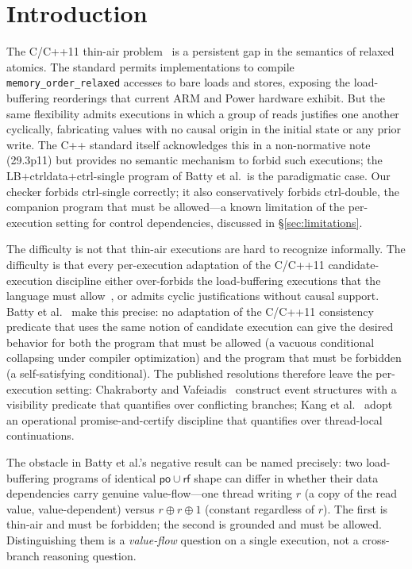 \documentclass{llncs}
\newcommand{\rf}{\mathsf{rf}}
\newcommand{\po}{\mathsf{po}}
\begin{document}
\section{Introduction}
\label{sec:intro}

The C/C++11 thin-air problem~\cite{boehmDemsky2014outlawing,batty2015problem}
is a persistent gap in the semantics of relaxed atomics. The standard permits
implementations to compile \texttt{memory\_order\_relaxed} accesses to bare
loads and stores, exposing the load-buffering reorderings that current ARM and
Power hardware exhibit. But the same flexibility admits executions in which a
group of reads justifies one another cyclically, fabricating values with no
causal origin in the initial state or any prior write. The C++ standard itself
acknowledges this in a non-normative note (29.3p11) but provides no semantic
mechanism to forbid such executions; the LB+ctrldata+ctrl-single program of
Batty et al.\ is the paradigmatic case. Our checker forbids ctrl-single
correctly; it also conservatively forbids ctrl-double, the companion program
that must be allowed---a known limitation of the per-execution setting for
control dependencies, discussed in \S\ref{sec:limitations}.

The difficulty is not that thin-air executions are hard to recognize
informally. The difficulty is that every per-execution adaptation of the
C/C++11 candidate-execution discipline either over-forbids the load-buffering
executions that the language must allow~\cite{lahav2017repairing}, or admits
cyclic justifications without causal support. Batty et
al.~\cite[Theorem~2]{batty2015problem} make this precise: no adaptation of
the C/C++11 consistency predicate that uses the same notion of candidate
execution can give the desired behavior for both the program that must be
allowed (a vacuous conditional collapsing under compiler optimization) and the
program that must be forbidden (a self-satisfying conditional). The published
resolutions therefore leave the per-execution setting: Chakraborty and
Vafeiadis~\cite{chakraborty2019grounding} construct event structures with a
visibility predicate that quantifies over conflicting branches; Kang et
al.~\cite{kang2017promising} adopt an operational promise-and-certify
discipline that quantifies over thread-local continuations.

The obstacle in Batty et al.'s negative result can be named precisely: two
load-buffering programs of identical $\po \cup \rf$ shape can differ in whether
their data dependencies carry genuine value-flow---one thread writing $r$
(a copy of the read value, value-dependent) versus $r \oplus r \oplus 1$ (constant regardless of $r$).
The first is thin-air and must be forbidden; the second is grounded and must be
allowed. Distinguishing them is a \emph{value-flow} question on a single
execution, not a cross-branch reasoning question.
\end{document}
